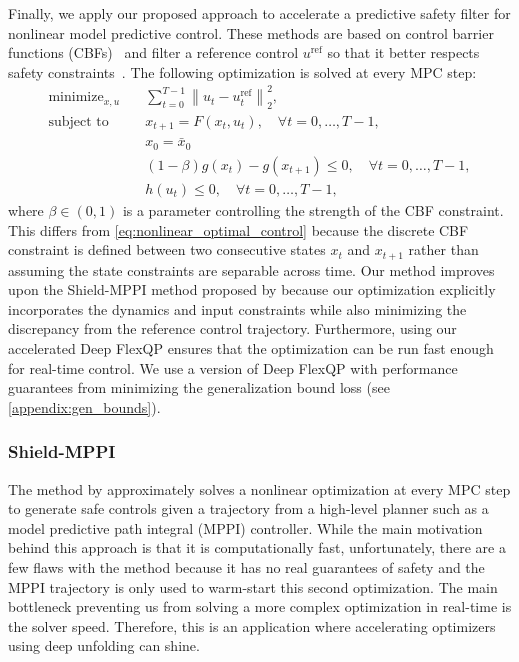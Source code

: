 \documentclass{article} %
\DeclareMathOperator*{\minimize}{minimize}
\DeclareMathOperator*{\st}{subject\ to}
\newcommand{\norm}[1]{\left\lVert#1\right\rVert}
\begin{document}
Finally, we apply our proposed approach to accelerate a predictive safety filter for nonlinear model predictive control. These methods are based on control barrier functions (CBFs)~\citep{ames2019control} and filter a reference control $u^\text{ref}$ so that it better respects safety constraints~\citep{wabersich2021predictive}.
The following optimization is solved at every MPC step:
\begin{subequations} \label{eq:predictive_safety_filter}
\begin{align}
    \minimize_{x, u} \quad & \sum_{t = 0}^{T - 1} \norm{u_t - u_t^\text{ref}}_2^2, \\
    \st \quad & x_{t + 1} = F(x_t, u_t), \quad \forall t = 0, \ldots, T - 1, \\
    & x_0 = \bar{x}_0 \\
    & (1 - \beta) g(x_t) - g(x_{t + 1}) \leq 0, \quad \forall t = 0, \ldots, T - 1, \\
    & h(u_t) \leq 0, \quad \forall t = 0, \ldots, T - 1,
\end{align}
\end{subequations}
where $\beta \in (0, 1)$ is a parameter controlling the strength of the CBF constraint. This differs from \cref{eq:nonlinear_optimal_control} because the discrete CBF constraint is defined between two consecutive states $x_t$ and $x_{t + 1}$ rather than assuming the state constraints are separable across time. Our method improves upon the Shield-MPPI method proposed by \citet{yin2023shield} because our optimization explicitly incorporates the dynamics and input constraints while also minimizing the discrepancy from the reference control trajectory. Furthermore, using our accelerated Deep FlexQP ensures that the optimization can be run fast enough for real-time control. We use a version of Deep FlexQP with performance guarantees from minimizing the generalization bound loss (see \cref{appendix:gen_bounds}).

\subsubsection{Shield-MPPI}

The method by \citet{yin2023shield} approximately solves a nonlinear optimization at every MPC step to generate safe controls given a trajectory from a high-level planner such as a model predictive path integral (MPPI) controller.
While the main motivation behind this approach is that it is computationally fast, unfortunately, there are a few flaws with the method because it has no real guarantees of safety and the MPPI trajectory is only used to warm-start this second optimization.
The main bottleneck preventing us from solving a more complex optimization in real-time is the solver speed.
Therefore, this is an application where accelerating optimizers using deep unfolding can shine.
\end{document}
